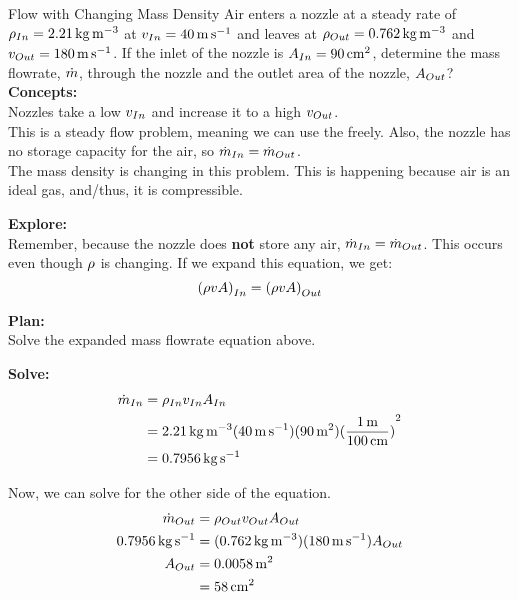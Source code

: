 \begin{example}{Flow with Changing Mass Density}
  Air enters a nozzle at a steady rate of $\rho_{In} = \SI{2.21}{\kilo\gram\per\cubic\meter}$ at $v_{In} = \SI{40}{\meter\per\second}$ and leaves at $\rho_{Out} = \SI{0.762}{\kilo\gram\per\cubic\meter}$ and $v_{Out} = \SI{180}{\meter\per\second}$.
  If the inlet of the nozzle is $A_{In} = \SI{90}{\square\centi\meter}$, determine the mass flowrate, $\dot{m}$, through the nozzle and the outlet area of the nozzle, $A_{Out}$?
  \tcblower{}
  \textbf{Concepts:} \\
  Nozzles take a low $v_{In}$ and increase it to a high $v_{Out}$. \\
  This is a steady flow problem, meaning we can use the  freely.
  Also, the nozzle has no storage capacity for the air, so $\dot{m}_{In} = \dot{m}_{Out}$. \\
  The mass density is changing in this problem.
  This is happening because air is an ideal gas, and/thus, it is compressible.

  \textbf{Explore:} \\
  Remember, because the nozzle does \textbf{not} store any air, $\dot{m}_{In} = \dot{m}_{Out}$.
  This occurs even though $\rho$ is changing.
  If we expand this equation, we get:
  \begin{equation*}
    {(\ensuremath{\rho}\ensuremath{v}\ensuremath{A})}_{In} = {(\rho v A)}_{Out}
  \end{equation*}

  \textbf{Plan:} \\
  Solve the expanded mass flowrate equation above.

  \textbf{Solve:} \\
  \begin{align*}
    \dot{m}_{In} &= \rho_{In} v_{In} A_{In} \\
                          &= \SI{2.21}{\kilo\gram\per\meter\cubed} (\SI{40}{\meter\per\second}) (\SI{90}{\meter\squared}) {(\frac{\SI{1}{\meter}}{\SI{100}{\centi\meter}})}^{2} \\
    &= \SI{0.7956}{\kilo\gram\per\second}
  \end{align*}

  Now, we can solve for the other side of the equation.
  \begin{align*}
    \dot{m}_{Out} &= \rho_{Out} v_{Out} A_{Out} \\
    \SI{0.7956}{\kilo\gram\per\second} &= (\SI{0.762}{\kilo\gram\per\meter\cubed}) (\SI{180}{\meter\per\second}) A_{Out} \\
    A_{Out} &= \SI{0.0058}{\meter\squared} \\
                           &= \SI{58}{\centi\meter\squared}
  \end{align*}


\end{example}
